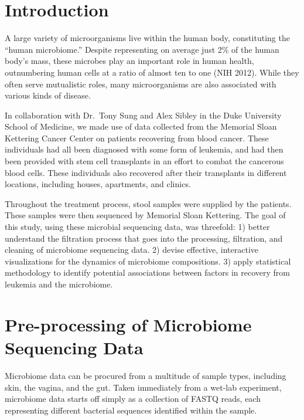 \documentclass[12pt,twoside]{dukestatscithesis}
\begin{document}
\chapter*{Introduction}\label{introduction}

A large variety of microorganisms live within the human body,
constituting the ``human microbiome.'' Despite representing on average
just 2\% of the human body's mass, these microbes play an important role
in human health, outnumbering human cells at a ratio of almost ten to
one (NIH 2012). While they often serve mutualistic roles, many
microorganisms are also associated with various kinds of disease.

In collaboration with Dr.~Tony Sung and Alex Sibley in the Duke
University School of Medicine, we made use of data collected from the
Memorial Sloan Kettering Cancer Center on patients recovering from blood
cancer. These individuals had all been diagnosed with some form of
leukemia, and had then been provided with stem cell transplants in an
effort to combat the cancerous blood cells. These individuals also
recovered after their transplants in different locations, including
houses, apartments, and clinics.

Throughout the treatment process, stool samples were supplied by the
patients. These samples were then sequenced by Memorial Sloan Kettering.
The goal of this study, using these microbial sequencing data, was
threefold: 1) better understand the filtration process that goes into
the processing, filtration, and cleaning of microbiome sequencing data.
2) devise effective, interactive visualizations for the dynamics of
microbiome compositions. 3) apply statistical methodology to identify
potential associations between factors in recovery from leukemia and the
microbiome.

\chapter{Pre-processing of Microbiome Sequencing
Data}\label{pre-processing-of-microbiome-sequencing-data}

Microbiome data can be procured from a multitude of sample types,
including skin, the vagina, and the gut. Taken immediately from a
wet-lab experiment, microbiome data starts off simply as a collection of
FASTQ reads, each representing different bacterial sequences identified
within the sample.
\end{document}
